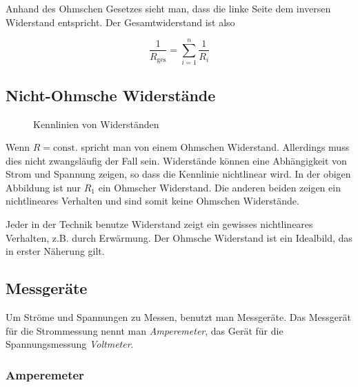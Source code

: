 \documentclass[a4paper,german,12pt,smallheadings]{scrartcl}
\begin{document}
Anhand des Ohmschen Gesetzes sieht man, dass die linke Seite dem inversen
Widerstand entspricht. Der Gesamtwiderstand ist also

\begin{equation}
  \frac{1}{R_\text{ges}} = \sum_{i=1}^n \frac{1}{R_i}
\end{equation}

\subsection{Nicht-Ohmsche Widerstände}
\begin{figure}[H]
  \begin{center}
    \caption{Kennlinien von Widerständen}
  \end{center}
\end{figure}

Wenn $R = \text{const.}$ spricht man von einem Ohmschen Widerstand. Allerdings
muss dies nicht zwangsläufig der Fall sein. Widerstände können eine
Abhängigkeit von Strom und Spannung zeigen, so dass die Kennlinie nichtlinear
wird. In der obigen Abbildung ist nur $R_1$ ein Ohmscher Widerstand. Die
anderen beiden zeigen ein nichtlineares Verhalten und sind somit keine Ohmschen
Widerstände.

Jeder in der Technik benutze Widerstand zeigt ein gewisses nichtlineares
Verhalten, z.B. durch Erwärmung. Der Ohmsche Widerstand ist ein Idealbild, das
in erster Näherung gilt.


\subsection{Messgeräte}

Um Ströme und Spannungen zu Messen, benutzt man Messgeräte. Das Messgerät für
die Strommessung nennt man \textit{Amperemeter}, das Gerät für die
Spannungsmessung \textit{Voltmeter}.

\subsubsection{Amperemeter}
\end{document}
